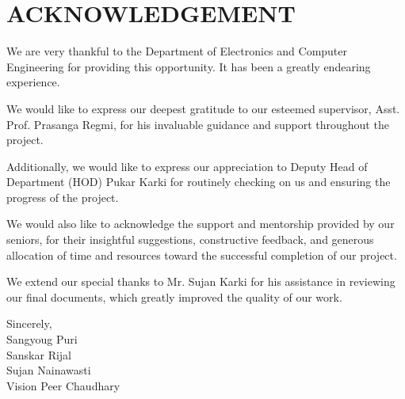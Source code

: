 \chapter*{ACKNOWLEDGEMENT} 

We are very thankful to the Department of Electronics and Computer Engineering for providing this opportunity. It has been a greatly endearing experience.

We would like to express our deepest gratitude to our esteemed supervisor, Asst. Prof. Prasanga Regmi, for his invaluable guidance and support throughout the project.

Additionally, we would like to express our appreciation to Deputy Head of Department (HOD) Pukar Karki for routinely checking on us and ensuring the progress of the project.

We would also like to acknowledge the support and mentorship provided by our seniors, for their insightful suggestions, constructive feedback, and generous allocation of time and resources toward the successful completion of our project.

We extend our special thanks to Mr. Sujan Karki for his assistance in reviewing our final documents, which greatly improved the quality of our work.

\vspace{1cm} Sincerely,\\ Sangyoug Puri\\ Sanskar Rijal\\ Sujan Nainawasti\\ Vision Peer Chaudhary
